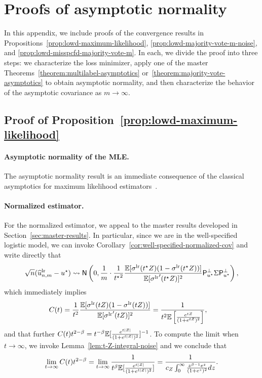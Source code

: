 
\section{Proofs of asymptotic normality}

In this appendix, we include proofs of the convergence results in
Propositions~\ref{prop:lowd-maximum-likelihood},
\ref{prop:lowd-majority-vote-m-noise}, and
\ref{prop:lowd-misspcfd-majority-vote-m}. In each, we divide the proof into
three steps: we characterize the loss minimizer, apply one of the master
Theorems~\ref{theorem:multilabel-asymptotics}
or~\ref{theorem:majority-vote-asymptotics} to obtain asymptotic normality,
and then characterize the behavior of the asymptotic covariance as $m \to
\infty$.

\subsection{Proof of Proposition~\ref{prop:lowd-maximum-likelihood}}
\label{proof:lowd-maximum-likelihood}

\paragraph{Asymptotic normality of the MLE.}
The asymptotic
normality result is an
immediate consequence of the classical asymptotics for maximum likelihood
estimators~\cite[Thm.~5.29]{VanDerVaart98}.


\paragraph{Normalized estimator.}
For the normalized estimator, we appeal to the master results developed in Section~\ref{sec:master-results}.
%
In particular, since we are in the well-specified logistic model, we can invoke Corollary~\ref{cor:well-specified-normalized-cov} and write directly that
\begin{equation*}
	\sqrt{n}(\widehat{u}_{n,m}^{\textup{lr}}- u^\star)
	\rightsquigarrow \mathsf{N}\left(0, \frac{1}{m} \cdot
	\frac{1}{{t^\star}^2}
	\frac{\mathbb{E}[\sigma^{\textup{lr}}(t^\star Z) (1 - \sigma^{\textup{lr}}(t^\star Z))]}{\mathbb{E}[{\sigma^{\textup{lr}}}'(t^\star Z)]^2}
	\mathsf{P}_{u^\star}^\perp \Sigma \mathsf{P}_{u^\star}^\perp \right),
\end{equation*}
which immediately implies
\begin{align*}
	C(t) & = \frac{1}{t^2}
	\frac{\mathbb{E}[\sigma^{\textup{lr}}(t Z) (1 - \sigma^{\textup{lr}}(t Z))]}{\mathbb{E}[{\sigma^{\textup{lr}}}'(t Z)]^2} = \frac{1}{t^2\mathbb{E}\left[\frac{e^{t Z} }{(1 + e^{t Z})^2}\right]},
\end{align*}
and that further $ C(t) {t}^{2 - \beta} = {t}^{-\beta} \mathbb{E}[\frac{e^{t|Z|}
  }{(1 + e^{t |Z|})^2}]^{-1}$. To compute the limit when $t \to
\infty$, we invoke Lemma~\ref{lem:t-Z-integral-noise} and
we conclude that
\begin{align*}
  \lim_{t \to \infty} C(t) t^{2 - \beta} = \lim_{t\to \infty}
  \frac{1}{t^\beta \mathbb{E}[\frac{e^{t |Z|} }{(1 + e^{t |Z|})^2}]}
  = \frac{1}{ c_Z \int_{0}^{\infty} \frac{z^{\beta - 1} e^{z} }{(1 + e^{z})^2}
    dz}.
\end{align*}

